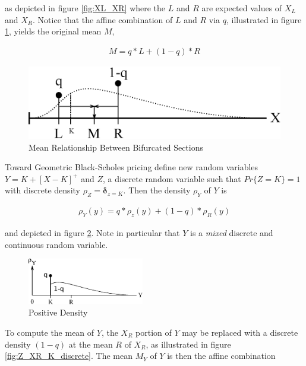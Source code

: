 as depicted in figure \ref{fig:XL_XR} where the $L$ and $R$ are expected values of $X_L$ and $X_R$. Notice that the affine combination of $L$ and $R$ via $q$, illustrated in figure \ref{fig:XL_XR_M}, yields the original mean $M$,

\begin{align*}
M = q * L + (1-q) * R
\end{align*}

\begin{figure}
  \centering
  \includegraphics{Images/XL_XR_M.eps}
  \caption[Mean Relationship Between Bifurcated Sections]
          {Mean Relationship Between Bifurcated Sections}
  \label{fig:XL_XR_M}
\end{figure}

Toward Geometric Black-Scholes pricing define new random variables $Y = K + [X-K]^+$ and $Z$, a discrete random variable such that $Pr\{Z = K\} = 1$ with discrete density $\rho_Z = \mathbf{\delta}_{z = K}$. Then the density $\rho_Y$ of $Y$ is

\begin{align*}
\rho_Y(y) = q * \rho_z(y) + (1-q) * \rho_R(y)
\end{align*}

and depicted in figure \ref{fig:Z_XR_K}. Note in particular that $Y$ is a \emph{mixed} discrete and continuous random variable.

\begin{figure}
  \centering
  \includegraphics[width=2in]{Images/Z_XR_K.eps}
  \caption[Positive Density]
          {Positive Density}
  \label{fig:Z_XR_K}
\end{figure}

To compute the mean of $Y$, the $X_R$ portion of $Y$ may be replaced with a discrete density $(1-q)$ at the mean $R$ of $X_R$, as illustrated in figure \ref{fig:Z_XR_K_discrete}. The mean $M_Y$ of $Y$ is then the affine combination

